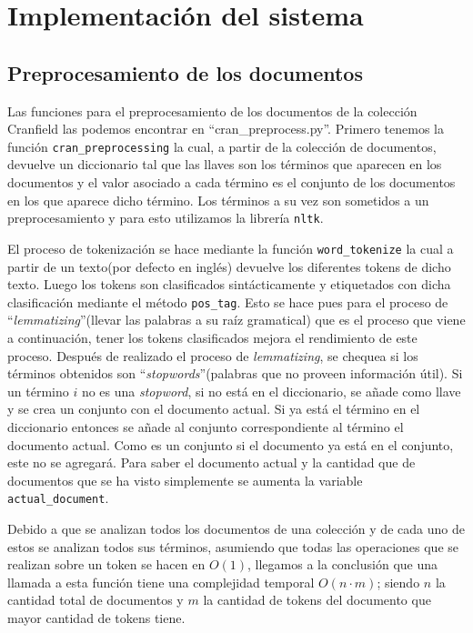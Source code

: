 \documentclass[runningheads]{llncs}
\begin{document}
	\section{Implementaci\'on del sistema}
	
	\subsection{Preprocesamiento de los documentos}
	
	Las funciones para el preprocesamiento de los documentos de la colecci\'on Cranfield las podemos encontrar en ``cran\_preprocess.py''. Primero tenemos la funci\'on \verb|cran_preprocessing| la cual, a partir de la colecci\'on de documentos, devuelve un diccionario tal que las llaves son los t\'erminos que aparecen en los documentos y el valor asociado a cada t\'ermino es el conjunto de los documentos en los que aparece dicho t\'ermino. Los t\'erminos a su vez son sometidos a un preprocesamiento y para esto utilizamos la librer\'ia \verb|nltk|.
	
	El proceso de tokenizaci\'on se hace mediante la funci\'on \verb|word_tokenize| la cual a partir de un texto(por defecto en ingl\'es) devuelve los diferentes tokens de dicho texto. Luego los tokens son clasificados sint\'acticamente y etiquetados con dicha clasificaci\'on mediante el m\'etodo \verb|pos_tag|. Esto se hace pues para el proceso de ``\textit{lemmatizing}''(llevar las palabras a su ra\'iz gramatical) que es el proceso que viene a continuaci\'on, tener los tokens clasificados mejora el rendimiento de este proceso. Despu\'es de realizado
	el proceso de \textit{lemmatizing}, se chequea si los t\'erminos obtenidos son ``\textit{stopwords}''(palabras que no proveen informaci\'on \'util). Si un t\'ermino $i$ no es una \textit{stopword}, si no est\'a en el diccionario, se a\~{n}ade como llave y se crea un conjunto con el documento actual. Si ya est\'a el t\'ermino en el diccionario entonces se a\~{n}ade al conjunto correspondiente al t\'ermino el documento actual. Como es un conjunto si el documento ya est\'a en el conjunto, este no se agregar\'a. Para saber el documento actual y la cantidad que de documentos que se ha visto simplemente se aumenta la variable \verb|actual_document|.
	
	Debido a que se analizan todos los documentos de una colecci\'on y de cada uno de estos se analizan todos sus t\'erminos, asumiendo que todas las operaciones que se realizan sobre un token se hacen en $O(1)$, llegamos a la conclusi\'on que una llamada a esta funci\'on tiene una complejidad temporal $O(n\cdot m)$; siendo $n$ la cantidad total de documentos y $m$ la cantidad de tokens del documento que mayor cantidad de tokens tiene.
	
\end{document}
